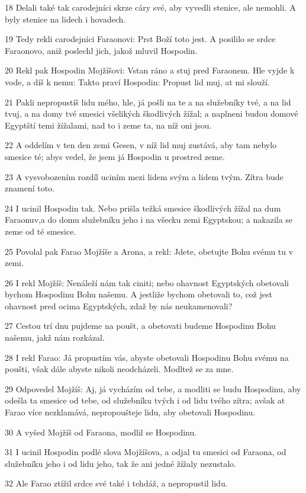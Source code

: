 \par 18 Delali také tak carodejníci skrze cáry své, aby vyvedli stenice, ale nemohli. A byly stenice na lidech i hovadech.
\par 19 Tedy rekli carodejníci Faraonovi: Prst Boží toto jest. A posililo se srdce Faraonovo, aniž poslechl jich, jakož mluvil Hospodin.
\par 20 Rekl pak Hospodin Mojžíšovi: Vstan ráno a stuj pred Faraonem. Hle vyjde k vode, a díš k nemu: Takto praví Hospodin: Propust lid muj, at mi slouží.
\par 21 Pakli nepropustíš lidu mého, hle, já pošli na te a na služebníky tvé, a na lid tvuj, a na domy tvé smesici všelikých škodlivých žížal; a naplneni budou domové Egyptští temi žížalami, nad to i zeme ta, na níž oni jsou.
\par 22 A oddelím v ten den zemi Gesen, v níž lid muj zustává, aby tam nebylo smesice té; abys vedel, že jsem já Hospodin u prostred zeme.
\par 23 A vysvobozením rozdíl uciním mezi lidem svým a lidem tvým. Zítra bude znamení toto.
\par 24 I ucinil Hospodin tak. Nebo prišla težká smesice škodlivých žížal na dum Faraonuv,a do domu služebníku jeho i na všecku zemi Egyptskou; a nakazila se zeme od té smesice.
\par 25 Povolal pak Farao Mojžíše a Arona, a rekl: Jdete, obetujte Bohu svému tu v zemi.
\par 26 I rekl Mojžíš: Nenáleží nám tak ciniti; nebo ohavnost Egyptských obetovali bychom Hospodinu Bohu našemu. A jestliže bychom obetovali to, což jest ohavnost pred ocima Egyptských, zdaž by nás neukamenovali?
\par 27 Cestou trí dnu pujdeme na poušt, a obetovati budeme Hospodinu Bohu našemu, jakž nám rozkázal.
\par 28 I rekl Farao: Já propustím vás, abyste obetovali Hospodinu Bohu svému na poušti, však dále abyste nikoli neodcházeli. Modltež se za mne.
\par 29 Odpovedel Mojžíš: Aj, já vycházím od tebe, a modliti se budu Hospodinu, aby odešla ta smesice od tebe, od služebníku tvých i od lidu tvého zítra; avšak at Farao více nezklamává, nepropoušteje lidu, aby obetovali Hospodinu.
\par 30 A vyšed Mojžíš od Faraona, modlil se Hospodinu.
\par 31 I ucinil Hospodin podlé slova Mojžíšova, a odjal tu smesici od Faraona, od služebníku jeho i od lidu jeho, tak že ani jedné žížaly nezustalo.
\par 32 Ale Farao ztížil srdce své také i tehdáž, a nepropustil lidu.

